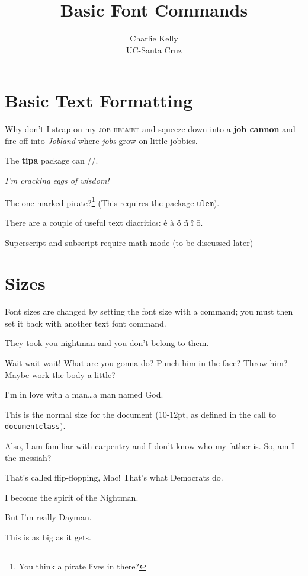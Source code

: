 \documentclass[10pt, twoside]{article}
\title{Basic Font Commands}
\author{Charlie Kelly\\UC-Santa Cruz}
\begin{document}
	
	\maketitle
	
		\section{Basic Text Formatting}
	
	Why don't I strap on my \textsc{job helmet} and squeeze down into a \textbf{job cannon} and fire off into \emph{Jobland} where \textit{jobs} grow on \uline{little jobbies.}
	
	The {\bf tipa} package can //.
	
	\textsl{I'm cracking eggs of wisdom!}
	
	  \sout{The one marked pirate?}\footnote{You think a pirate lives in there?} (This requires the package \texttt{ulem}).
	
	There are a couple of useful text diacritics: \'{e} \`{a} \"{o} \~{n} \^{i}  \={o}.
	
	Superscript and subscript require math mode (to be discussed later)
	
	\section{Sizes}
	
	Font sizes are changed by setting the font size with a command; you must then set it back with another text font command.
	
	\tiny
	
	They took you nightman and you don't belong to them.
	
	\scriptsize
	
	Wait wait wait! What are you gonna do? Punch him in the face? Throw him? Maybe work the body a little?
	
	\small
	
	I'm in love with a man\ldots a man named God.
	
	\normalsize
	
	This is the normal size for the document (10-12pt, as defined in the call to \texttt{documentclass}).
	
	\large
	
	Also, I am familiar with carpentry and I don't know who my father is. So, am I the messiah?
	
	\Large
	
	That's called flip-flopping, Mac! That's what Democrats do.
	
	\LARGE
	
	I become the spirit of the Nightman.
	
	\huge
	
	But I'm really Dayman.
	
	\Huge
	
	This is as big as it gets.
	
\end{document}
